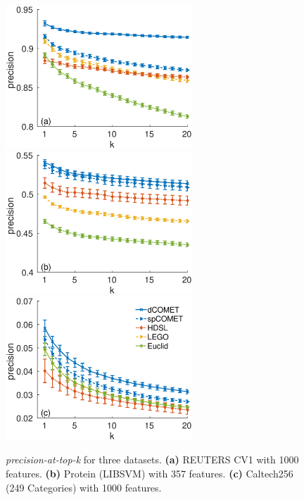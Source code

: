 \documentclass[twoside,11pt]{article}
\begin{document}
\begin{figure}[ht]
{
  \centering
  \includegraphics[width=7cm]{precision@k_rcv1_4_ig1000}
  \includegraphics[width=7cm]{precision@k_protein}
  \newline
  \includegraphics[width=7cm]{precision@k_Caltech256_with_249Categories}
  \caption{\textit{precision-at-top-k} for three datasets. {\bf (a)} REUTERS CV1 with 1000 features. {\bf (b)} Protein (LIBSVM) with 357 features. {\bf (c)} Caltech256 (249 Categories) with 1000 features.}
}
\end{figure}



\vskip 0.2in
\clearpage 

\end{document}
